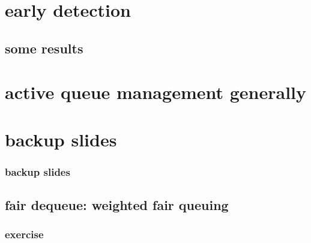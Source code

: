 \section{early detection}


\subsection{some results}


\section{active queue management generally}




\section{backup slides}
\begin{frame}\frametitle{backup slides}
\end{frame}

\subsection{fair dequeue: weighted fair queuing}



\subsubsection{exercise}







